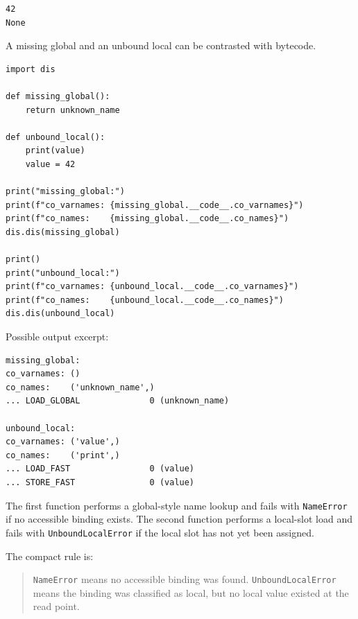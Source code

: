\begin{verbatim}
42
None
\end{verbatim}

A missing global and an unbound local can be contrasted with bytecode.

\begin{verbatim}
import dis

def missing_global():
    return unknown_name

def unbound_local():
    print(value)
    value = 42

print("missing_global:")
print(f"co_varnames: {missing_global.__code__.co_varnames}")
print(f"co_names:    {missing_global.__code__.co_names}")
dis.dis(missing_global)

print()
print("unbound_local:")
print(f"co_varnames: {unbound_local.__code__.co_varnames}")
print(f"co_names:    {unbound_local.__code__.co_names}")
dis.dis(unbound_local)
\end{verbatim}

Possible output excerpt:

\begin{verbatim}
missing_global:
co_varnames: ()
co_names:    ('unknown_name',)
... LOAD_GLOBAL              0 (unknown_name)

unbound_local:
co_varnames: ('value',)
co_names:    ('print',)
... LOAD_FAST                0 (value)
... STORE_FAST               0 (value)
\end{verbatim}

The first function performs a global-style name lookup and fails with \texttt{NameError} if no accessible binding exists. The second function performs a local-slot load and fails with \texttt{UnboundLocalError} if the local slot has not yet been assigned.

The compact rule is:

\begin{quote}
\texttt{NameError} means no accessible binding was found. \texttt{UnboundLocalError} means the binding was classified as local, but no local value existed at the read point.
\end{quote}